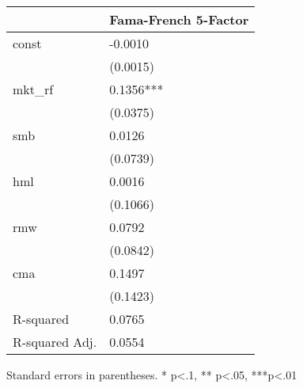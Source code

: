 \begin{table}
\caption{}
\label{}
\begin{center}
\begin{tabular}{ll}
\hline
               & Fama-French 5-Factor  \\
\hline
const          & -0.0010               \\
               & (0.0015)              \\
mkt\_rf        & 0.1356***             \\
               & (0.0375)              \\
smb            & 0.0126                \\
               & (0.0739)              \\
hml            & 0.0016                \\
               & (0.1066)              \\
rmw            & 0.0792                \\
               & (0.0842)              \\
cma            & 0.1497                \\
               & (0.1423)              \\
R-squared      & 0.0765                \\
R-squared Adj. & 0.0554                \\
\hline
\end{tabular}
\end{center}
\end{table}
\bigskip
Standard errors in parentheses. \newline 
* p<.1, ** p<.05, ***p<.01